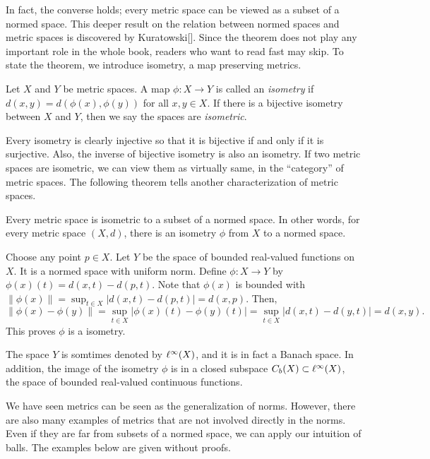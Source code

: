\documentclass{../crs}
\begin{document}
In fact, the converse holds; every metric space can be viewed as a subset of a normed space.
This deeper result on the relation between normed spaces and metric spaces is discovered by Kuratowski[].
Since the theorem does not play any important role in the whole book, readers who want to read fast may skip.
To state the theorem, we introduce isometry, a map preserving metrics.

\begin{defn}
Let $X$ and $Y$ be metric spaces.
A map $\phi:X\to Y$ is called an \emph{isometry} if $d(x,y)=d(\phi(x),\phi(y))$ for all $x,y\in X$.
If there is a bijective isometry between $X$ and $Y$, then we say the spaces are \emph{isometric}.
\end{defn}

Every isometry is clearly injective so that it is bijective if and only if it is surjective.
Also, the inverse of bijective isometry is also an isometry.
If two metric spaces are isometric, we can view them as virtually same, in the ``category'' of metric spaces.
The following theorem tells another characterization of metric spaces.

\begin{prop}
Every metric space is isometric to a subset of a normed space.
In other words, for every metric space $(X,d)$, there is an isometry $\phi$ from $X$ to a normed space.
\end{prop}
\begin{pf}
Choose any point $p\in X$.
Let $Y$ be the space of bounded real-valued functions on $X$.
It is a normed space with uniform norm.
Define $\phi:X\to Y$ by $\phi(x)(t)=d(x,t)-d(p,t)$.
Note that $\phi(x)$ is bounded with $\|\phi(x)\|=\sup_{t\in X}|d(x,t)-d(p,t)|=d(x,p)$.
Then,
\[\|\phi(x)-\phi(y)\|=\sup_{t\in X}|\phi(x)(t)-\phi(y)(t)|=\sup_{t\in X}|d(x,t)-d(y,t)|=d(x,y).\]
This proves $\phi$ is a isometry.
\end{pf}
\begin{rmk}
The space $Y$ is somtimes denoted by $\ell^\infty(X)$, and it is in fact a Banach space.
In addition, the image of the isometry $\phi$ is in a closed subspace $C_b(X)\subset\ell^\infty(X)$, the space of bounded real-valued continuous functions.
\end{rmk}

We have seen metrics can be seen as the generalization of norms.
However, there are also many examples of metrics that are not involved directly in the norms.
Even if they are far from subsets of a normed space, we can apply our intuition of balls.
The examples below are given without proofs.
\end{document}
